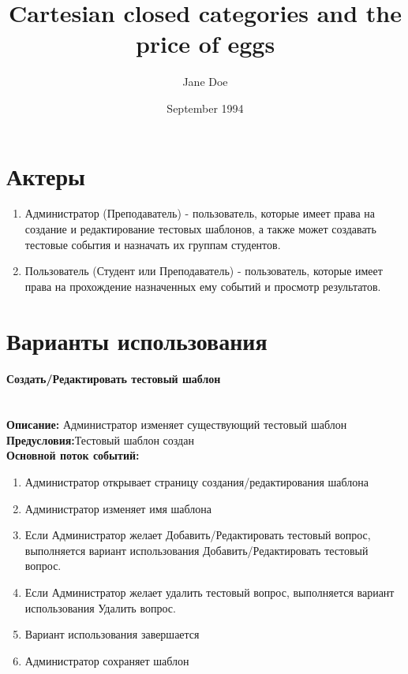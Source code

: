 \documentclass{article}
\title{Cartesian closed categories and the price of eggs}
\author{Jane Doe}
\date{September 1994}
\newcommand{\paragraphline}[1]{\paragraph{#1}\mbox{}\\}
\begin{document}
    \maketitle
    \section{Актеры}
    \begin{enumerate}
        \item Администратор (Преподаватель) - пользователь, которые имеет права на создание и редактирование тестовых шаблонов, а также может создавать тестовые события и назначать их группам студентов.
        \item Пользователь (Студент или Преподаватель) - пользователь, которые имеет права на прохождение назначенных ему событий и просмотр результатов.
    \end{enumerate}
    

    \section{Варианты использования}
    \paragraphline{Создать/Редактировать тестовый шаблон}
    \textbf{Описание:} Администратор изменяет существующий тестовый шаблон\\
    \textbf{Предусловия:}Тестовый шаблон создан\\
    \textbf{Основной поток событий:}
    \begin{enumerate}
        \item Администратор открывает страницу создания/редактирования шаблона
        \item Администратор изменяет имя шаблона
        \item Если Администратор желает Добавить/Редактировать тестовый вопрос, выполняется вариант использования Добавить/Редактировать тестовый вопрос.
        \item Если Администратор желает удалить тестовый вопрос, выполняется вариант использования Удалить вопрос.
        \item Вариант использования завершается
        \item Администратор сохраняет шаблон
    \end{enumerate} 
    
\end{document}

